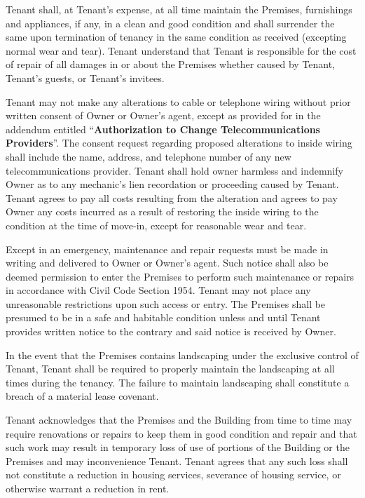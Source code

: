 \documentclass[8pt, letterpaper, oneside]{extarticle}
\newcounter{para}
\newcommand\numparagraph{\par\refstepcounter{para}\textbf{\thepara}\hspace{5mm}}
\begin{document}
 \numparagraph{\textbf{MAINTENANCE AND REPAIRS:}\hspace{2mm}} Tenant shall, at Tenant's expense, at all time maintain the Premises, furnishings and appliances, if any, in a clean and good condition and shall surrender the same upon termination of tenancy in the same condition as received (excepting normal wear and tear). Tenant understand that Tenant is responsible for the cost of repair of all damages in or about the Premises whether caused by Tenant, Tenant's guests, or Tenant's invitees.
 
 Tenant may not make any alterations to cable or telephone wiring without prior written consent of Owner or Owner's agent, except as provided for in the addendum entitled ``\textbf{Authorization to Change Telecommunications Providers}''. The consent request regarding proposed alterations to inside wiring shall include the name, address, and telephone number of any new telecommunications provider. Tenant shall hold owner harmless and indemnify Owner as to any mechanic's lien recordation or proceeding caused by Tenant. Tenant agrees to pay all costs resulting from the alteration and agrees to pay Owner any costs incurred as a result of restoring the inside wiring to the condition at the time of move-in, except for reasonable wear and tear.

 Except in an emergency, maintenance and repair requests must be made in writing and delivered to Owner or Owner's agent. Such notice shall also be deemed permission to enter the Premises to perform such maintenance or repairs in accordance with Civil Code Section 1954. Tenant may not place any unreasonable restrictions upon such access or entry. The Premises shall be presumed to be in a safe and habitable condition unless and until Tenant provides written notice to the contrary and said notice is received by Owner.

 In the event that the Premises contains landscaping under the exclusive control of Tenant, Tenant shall be required to properly maintain the landscaping at all times during the tenancy. The failure to maintain landscaping shall constitute a breach of a material lease covenant.

 Tenant acknowledges that the Premises and the Building from time to time may require renovations or repairs to keep them in good condition and repair and that such work may result in temporary loss of use of portions of the Building or the Premises and may inconvenience Tenant. Tenant agrees that any such loss shall not constitute a reduction in housing services, severance of housing service, or otherwise warrant a reduction in rent.
\end{document}
